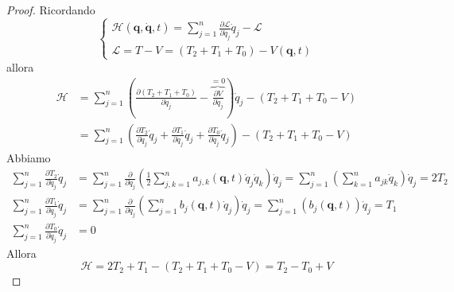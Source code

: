 \documentclass[a4paper,10pt]{article}
\theoremstyle{definition}
\newcommand{\bv}{\boldsymbol} %
\theoremstyle{indentdefinition}
\theoremstyle{indenttheorem}
\theoremstyle{myremark}
\theoremstyle{indentgeneral}
\begin{document}
\begin{proof}
Ricordando
$$\begin{cases}
\mathcal{H}\left(\bv{q},\dot{\bv{q}},t\right)=\sum_{j=1}^{n}\frac{\partial\mathcal{L}}{\partial\dot{q}_{j}}\dot{q}_{j}-\mathcal{L} \\
\mathcal{L}=T-V=(T_2+T_1+T_0)-V(\bv{q},t)
\end{cases}$$
allora
\begin{align*}
   \mathcal{H}&= \sum_{j=1}^{n}\left(\frac{\partial\left(T_{2}+T_1+T_0\right)}{\partial\dot{q}_{j}}-\overbrace{\frac{\partial V}{\partial \dot{q}_j}}^{=0}\right)\dot{q}_{j}-\left(T_{2}+T_1+T_0-V\right) \\
   &= \sum_{j=1}^{n}\left(\frac{\partial T_{2}}{\partial\dot{q}_{j}}\dot{q}_{j} + \frac{\partial T_{1}}{\partial\dot{q}_{j}}\dot{q}_{j}+\frac{\partial T_{0}}{\partial\dot{q}_{j}}\dot{q}_{j}\right)-\left(T_{2}+T_1+T_0-V\right)
\end{align*}
Abbiamo
\begin{align*}
     \sum_{j=1}^{n}\frac{\partial T_{2}}{\partial\dot{q}_{j}}\dot{q}_{j}&= \sum_{j=1}^{n}\frac{\partial}{\partial\dot{q}_{j}}\left( \frac{1}{2}\sum_{j,k=1}^n a_{j,k}(\bv{q},t)\dot{q}_j\dot{q}_k \right)\dot{q}_{j}=\sum_{j=1}^{n}(\sum_{k=1}^na_{jk}\dot{q}_k)\dot{q}_j =2T_2\\
     \sum_{j=1}^{n}\frac{\partial T_{1}}{\partial\dot{q}_{j}}\dot{q}_{j}&=\sum_{j=1}^{n}   \frac{\partial}{\partial\dot{q}_{j}}\left(\sum_{j=1}^nb_j(\bv{q},t)\dot{q}_{j}\right)\dot{q}_{j}=\sum_{j=1}^n\left(b_j(\bv{q},t)\right)\dot{q}_{j}=T_1\\
     \sum_{j=1}^{n}\frac{\partial T_{0}}{\partial\dot{q}_{j}}\dot{q}_{j}&= 0
\end{align*}
Allora
$$\mathcal{H}=2T_2+T_1-(T_2+T_1+T_0-V)=T_2-T_0+V$$
\end{proof}
\end{document}
